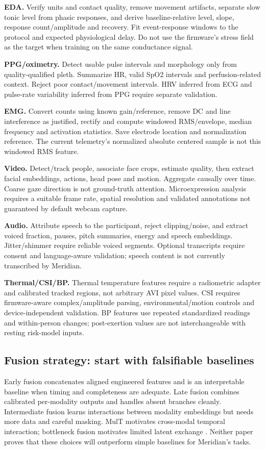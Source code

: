 \documentclass[11pt,a4paper]{article}
\begin{document}
\textbf{EDA.} Verify units and contact quality, remove movement artifacts, separate slow tonic level from phasic responses, and derive baseline-relative level, slope, response count/amplitude and recovery. Fit event-response windows to the protocol and expected physiological delay. Do not use the firmware's stress field as the target when training on the same conductance signal.

\textbf{PPG/oximetry.} Detect usable pulse intervals and morphology only from quality-qualified pleth. Summarize HR, valid SpO2 intervals and perfusion-related context. Reject poor contact/movement intervals. HRV inferred from ECG and pulse-rate variability inferred from PPG require separate validation.

\textbf{EMG.} Convert counts using known gain/reference, remove DC and line interference as justified, rectify and compute windowed RMS/envelope, median frequency and activation statistics. Save electrode location and normalization reference. The current telemetry's normalized absolute centered sample is not this windowed RMS feature.

\textbf{Video.} Detect/track people, associate face crops, estimate quality, then extract facial embeddings, actions, head pose and motion. Aggregate causally over time. Coarse gaze direction is not ground-truth attention. Microexpression analysis requires a suitable frame rate, spatial resolution and validated annotations not guaranteed by default webcam capture.

\textbf{Audio.} Attribute speech to the participant, reject clipping/noise, and extract voiced fraction, pauses, pitch summaries, energy and speech embeddings. Jitter/shimmer require reliable voiced segments. Optional transcripts require consent and language-aware validation; speech content is not currently transcribed by Meridian.

\textbf{Thermal/CSI/BP.} Thermal temperature features require a radiometric adapter and calibrated tracked regions, not arbitrary AVI pixel values. CSI requires firmware-aware complex/amplitude parsing, environmental/motion controls and device-independent validation. BP features use repeated standardized readings and within-person changes; post-exertion values are not interchangeable with resting risk-model inputs.

\subsection{Fusion strategy: start with falsifiable baselines}
Early fusion concatenates aligned engineered features and is an interpretable baseline when timing and completeness are adequate. Late fusion combines calibrated per-modality outputs and handles absent branches cleanly. Intermediate fusion learns interactions between modality embeddings but needs more data and careful masking. MulT motivates cross-modal temporal interaction; bottleneck fusion motivates limited latent exchange \cite{mult,mbt}. Neither paper proves that these choices will outperform simple baselines for Meridian's tasks.
\end{document}
